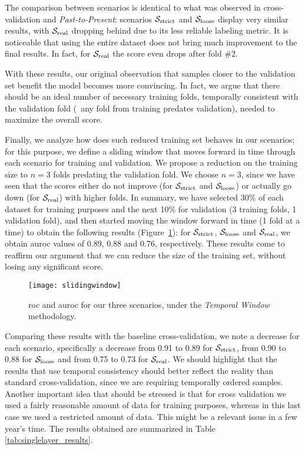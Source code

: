 The comparison between scenarios is identical to what was observed in cross-validation and \textit{Past-to-Present}: scenarios $\mathcal{S}_{\mathrm{strict}}$ and $\mathcal{S}_{\mathrm{loose}}$ display very similar results, with $\mathcal{S}_{\mathrm{real}}$ dropping behind due to its less reliable labeling metric.
It is noticeable that using the entire dataset does not bring much improvement to the final results. In fact, for $\mathcal{S}_{\mathrm{real}}$ the score even drops after fold $\#2$.

With these results, our original observation that samples closer to the validation set benefit the model becomes more convincing. In fact, we argue that there should be an ideal number of necessary training folds, temporally consistent with the validation fold (\ie\ any fold from training predates validation), needed to maximize the overall score.

\medskip

Finally, we analyze how does such reduced training set behaves in our scenarios; for this purpose, we define a sliding window that moves forward in time through each scenario for training and validation.
We propose a reduction on the training size to $n=3$ folds predating the validation fold.
We choose $n = 3$, since we have seen that the scores either do not improve (for $\mathcal{S}_{\mathrm{strict}}$ and $\mathcal{S}_{\mathrm{loose}}$) or actually go down (for $\mathcal{S}_{\mathrm{real}}$) with higher folds.
In summary, we have selected 30\% of each dataset for training purposes and the next 10\% for validation (3 training folds, 1 validation fold), and then started moving the window forward in time (1 fold at a time) to obtain the following results (Figure~\ref{fig:slidingwindow}): for  $\mathcal{S}_{\mathrm{strict}}$, $\mathcal{S}_{\mathrm{loose}}$ and $\mathcal{S}_{\mathrm{real}}$, we obtain \gls{auroc} values of 0.89, 0.88 and 0.76, respectively. 
These results come to reaffirm our argument that we can reduce the size of the training set, without losing any significant score.

\begin{figure}[!h]
	\centering
	\texttt{[image: slidingwindow]}
	\caption{\gls{roc} and \gls{auroc} for our three scenarios, under the \textit{Temporal Window} methodology.}
	\label{fig:slidingwindow}
\end{figure}

Comparing these results with the baseline cross-validation, we note a decrease for each scenario, specifically a decrease from 0.91 to 0.89 for $\mathcal{S}_{\mathrm{strict}}$, from 0.90 to 0.88 for $\mathcal{S}_{\mathrm{loose}}$ and from 0.75 to 0.73 for $\mathcal{S}_{\mathrm{real}}$.
We should highlight that the results that use temporal consistency should better reflect the reality than standard cross-validation, since we are requiring temporally ordered samples.
Another important idea that should be stressed is that for cross validation we used a fairly reasonable amount of data for training purposes, whereas in this last case we used a restricted amount of data. This might be a relevant issue in a few year's time. The results obtained are summarized in Table \ref{tab:singlelayer_results}.

